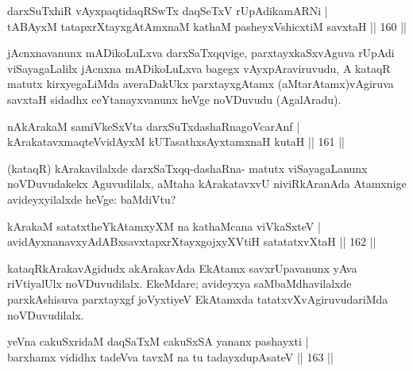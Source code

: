 \begin{shl}
darxSuTxhiR vAyxpaqtidaqRSwTx daqSeTxV rUpAdikamARNi |\\
tABAyxM tatapxrXtayxgAtAmxnaM kathaM pasheyxVshicxtiM savxtaH \hfill || 160 ||
\end{shl}

\begin{artha}
jAcnxnavanunx mADikoLuLxva darxSaTxqqvige, parxtayxkaSxvAguva rUpAdi viSayagaLalilx jAcnxna mADikoLuLxva bagegx vAyxpAraviruvudu, A kataqR matutx kirxyegaLiMda averaDakUkx parxtayxgAtamx (aMtarAtamx)vAgiruva savxtaH sidadhx ceYtanayxvanunx heVge noVDuvudu (AgalAradu).
\end{artha}

\begin{shl}
nAkArakaM samiVkeSxVta darxSuTxdashaRnagoVcarAnf |\\
kArakatavxmaqteV\s vidAyxM kUTasathxsAyx\s \s tamxnaH kutaH \hfill || 161 ||
\end{shl}

\begin{artha}
(kataqR) kArakavilalxde darxSaTxqq-dashaRna- matutx viSayagaLanunx noVDuvudakekx Aguvudilalx, aMtaha kArakatavxvU niviRkAranAda Atamxnige avideyxyilalxde heVge: baMdiVtu?
\end{artha}

\begin{shl}
kArakaM satatxtheYkAtamxyXM na kathaMcana viVkaSxteV |\\
avidAyxnanavxyAdABxsavxtapxrXtayxgojxyXVtiH satatatxvXtaH \hfill || 162 ||
\end{shl}

\begin{artha}
kataqRkArakavAgidudx akArakavAda EkAtamx savxrUpavanunx yAva riVtiyalUlx noVDuvudilalx. EkeMdare; avideyxya saMbaMdhavilalxde parxkAshisuva parxtayxgf joVyxtiyeV EkAtamxda tatatxvXvAgiruvudariMda noVDuvudilalx.
\end{artha}

\begin{shl}
\footnotemark[1]{}yeVna cakuSxridaM daqSaTxM cakuSxSA yananx pashayxti |\\
barxhamx vididhx tadeVva tavxM na tu tadayxdupAsateV \hfill || 163 ||
\end{shl}

